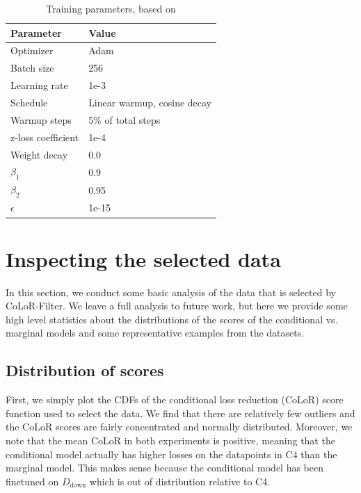 \documentclass{article}
\newcommand{\Ddown}{D_{\text{down}}}
\begin{document}
\begin{table}[h]
    \caption{Training parameters, based on \cite{wortsman2024smallscale, groeneveld2024olmo}}
    \label{tab:train-hyper}
    \centering
    \begin{tabular}{l|l}
    \toprule
        Parameter & Value \\
        \midrule
        Optimizer & Adam\\
        Batch size & 256\\
        Learning rate & 1e-3\\
        Schedule & Linear warmup, cosine decay\\
        Warmup steps & 5\% of total steps\\
        z-loss coefficient & 1e-4\\
        Weight decay & 0.0\\
        $ \beta_1$ & 0.9\\
        $ \beta_2$ & 0.95\\
        $ \epsilon$ & 1e-15\\
    \bottomrule
    \end{tabular}
\end{table}

\newpage

\section{Inspecting the selected data}\label{app:analysis}


In this section, we conduct some basic analysis of the data that is selected by CoLoR-Filter. We leave a full analysis to future work, but here we provide some high level statistics about the distributions of the scores of the conditional vs. marginal models and some representative examples from the datasets.

\subsection{Distribution of scores}

First, we simply plot the CDFs of the conditional loss reduction (CoLoR) score function used to select the data. We find that there are relatively few outliers and the CoLoR scores are fairly concentrated and normally distributed. Moreover, we note that the mean CoLoR in both experiments is positive, meaning that the conditional model actually has higher losses on the datapoints in C4 than the marginal model. This makes sense because the conditional model has been finetuned on $ \Ddown$ which is out of distribution relative to C4.
\end{document}

